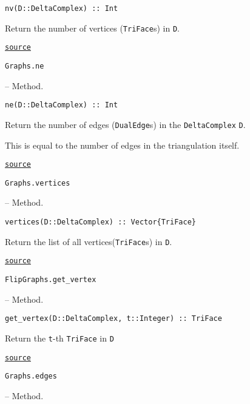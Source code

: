 \begin{adjustwidth}{2em}{0pt}


\begin{verbatim}
nv(D::DeltaComplex) :: Int
\end{verbatim}

Return the number of vertices (\texttt{TriFace}s) in \texttt{D}.



\href{https://github.com/schto223/FlipGraphs.jl/blob/e35d43698a06b86273148826b79d585ba04fcd26/src/deltaComplex.jl#L351-L355}{\texttt{source}}


\end{adjustwidth}
\hypertarget{16904350056714108716}{\texttt{Graphs.ne}}  -- {Method.}

\begin{adjustwidth}{2em}{0pt}


\begin{verbatim}
ne(D::DeltaComplex) :: Int
\end{verbatim}

Return the number of edges (\texttt{DualEdge}s) in the \texttt{DeltaComplex} \texttt{D}.

This is equal to the number of edges in the triangulation itself.



\href{https://github.com/schto223/FlipGraphs.jl/blob/e35d43698a06b86273148826b79d585ba04fcd26/src/deltaComplex.jl#L358-L364}{\texttt{source}}


\end{adjustwidth}
\hypertarget{17625980901339751316}{\texttt{Graphs.vertices}}  -- {Method.}

\begin{adjustwidth}{2em}{0pt}


\begin{verbatim}
vertices(D::DeltaComplex) :: Vector{TriFace}
\end{verbatim}

Return the list of all vertices(\texttt{TriFace}s) in \texttt{D}.



\href{https://github.com/schto223/FlipGraphs.jl/blob/e35d43698a06b86273148826b79d585ba04fcd26/src/deltaComplex.jl#L292-L296}{\texttt{source}}


\end{adjustwidth}
\hypertarget{9599335666183177786}{\texttt{FlipGraphs.get\_vertex}}  -- {Method.}

\begin{adjustwidth}{2em}{0pt}


\begin{verbatim}
get_vertex(D::DeltaComplex, t::Integer) :: TriFace
\end{verbatim}

Return the \texttt{t}-th \texttt{TriFace} in \texttt{D}



\href{https://github.com/schto223/FlipGraphs.jl/blob/e35d43698a06b86273148826b79d585ba04fcd26/src/deltaComplex.jl#L285-L289}{\texttt{source}}


\end{adjustwidth}
\hypertarget{891918059960523943}{\texttt{Graphs.edges}}  -- {Method.}

